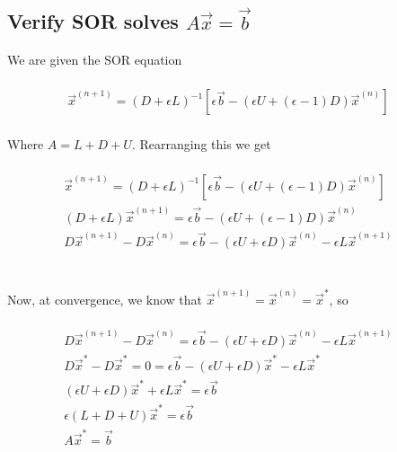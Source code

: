 \documentclass[../main.tex]{subfiles}
\begin{document}
    \subsection*{Verify SOR solves $A\vec{x}=\vec{b}$}\label{subsec:verify-sor-solves-linear-problem}

    We are given the SOR equation
    \begin{center*}
        \begin{align*}
            \\
            & \vec{x}^{(n+1)} = (D+ \epsilon L)^{-1}[\epsilon \vec{b} - (\epsilon U + (\epsilon - 1)D)\vec{x}^{(n)}] && \\
        \end{align*}
    \end{center*}
    Where $A = L + D + U$. Rearranging this we get
    \begin{center*}
        \begin{align*}
            \\
            & \vec{x}^{(n+1)} = (D+ \epsilon L)^{-1}[\epsilon \vec{b} - (\epsilon U + (\epsilon - 1)D)\vec{x}^{(n)}] && \\
            & (D+ \epsilon L) \vec{x}^{(n+1)} = \epsilon \vec{b} - (\epsilon U + (\epsilon - 1)D)\vec{x}^{(n)} \\
            & D\vec{x}^{(n+1)} - D\vec{x}^{(n)} = \epsilon \vec{b} - (\epsilon U + \epsilon D)\vec{x}^{(n)} - \epsilon L \vec{x}^{(n+1)} && \\
        \end{align*}
    \end{center*}\\
    Now, at convergence, we know that $\vec{x}^{(n+1)} = \vec{x}^{(n)} = \vec{x}^{\ast}$, so
    \begin{center*}
        \begin{align*}
            \\
            & D\vec{x}^{(n+1)} - D\vec{x}^{(n)} = \epsilon \vec{b} - (\epsilon U + \epsilon D)\vec{x}^{(n)} - \epsilon L \vec{x}^{(n+1)} && \\
            & D\vec{x}^{\ast} - D\vec{x}^{\ast} = 0 = \epsilon \vec{b} - (\epsilon U + \epsilon D)\vec{x}^{\ast} - \epsilon L \vec{x}^{\ast} && \\
            & (\epsilon U + \epsilon D)\vec{x}^{\ast} + \epsilon L \vec{x}^{\ast} = \epsilon \vec{b} && \\
            & \epsilon(L + D + U)\vec{x}^{\ast} = \epsilon \vec{b} && \\
            & A \vec{x}^{\ast} = \vec{b} && \\
        \end{align*}
    \end{center*}
\end{document}
